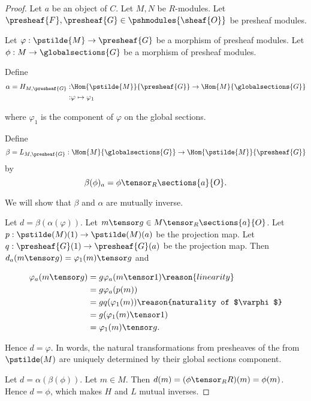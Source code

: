 
\begin{proof}
Let $a$ be an object of $C$.
Let $M,N$ be $R$-modules. 
Let $\presheaf{F},\presheaf{G} \in \pshmodules{\sheaf{O}}$ be presheaf modules.

Let $\varphi:\pstilde{M} \rightarrow \presheaf{G}$ be a morphism of presheaf modules.
Let $\phi: M \rightarrow \globalsections{G}$ be a morphism of presheaf modules.

Define
\begin{align*}
\alpha = H_{M,\presheaf{G}} :& 
	\Hom{\pstilde{M}}{\presheaf{G}} \rightarrow \Hom{M}{\globalsections{G}} \\
	:& \varphi \mapsto \varphi_1
\end{align*}

where $\varphi_1$ is the component of $\varphi$ on the global sections.

Define 
\[\beta = L_{M,\presheaf{G}}: 
	\Hom{M}{\globalsections{G}} \rightarrow \Hom{\pstilde{M}}{\presheaf{G}}
\] 
by
\[ \beta(\phi)_a = \phi \tensor_R \sections{a}{O}.\]

We will show that $\beta$ and $\alpha$ are mutually inverse. 

Let $d = \beta(\alpha(\varphi))$. 
Let $m \tensor g \in M \tensor_R \sections{a}{O}$.
Let $p: \pstilde(M)(1)\rightarrow \pstilde(M)(a)$ be the projection map.
Let $q: \presheaf{G}(1)\rightarrow \presheaf{G}(a)$ be the projection map.
Then $d_a(m \tensor g) = \varphi_1(m) \tensor g$
and

\begin{align*}
	\varphi_a(m \tensor g) &=  g \varphi_a(m \tensor 1) \reason{linearity}\\
		&= g \varphi_a(p(m)) \\
		&= g q(\varphi_1(m)) \reason{naturality of $\varphi$}\\
		&= g (\varphi_1(m) \tensor 1) \\
		&= \varphi_1(m) \tensor g.
\end{align*}

Hence $d = \varphi$. 
In words, the natural transformations from presheaves of the from $\pstilde(M)$ 
are uniquely determined by their global sections component.

Let $d = \alpha(\beta(\phi))$. 
Let $m \in M$.
Then $d(m) = (\phi \tensor_R R)(m) = \phi(m)$.
Hence $d = \phi$, which makes $H$ and $L$ mutual inverses.


\end{proof}
